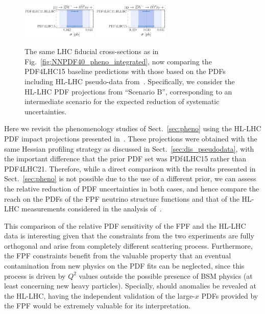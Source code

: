 \begin{figure}[!h]
	\includegraphics[width=0.32\textwidth]{plots/LHCpheno/NNPDF_WPZ_14TEV_40_PHENO-integrated-HLLHC.pdf}
	\includegraphics[width=0.32\textwidth]{plots/LHCpheno/NNPDF_WMZ_14TEV_40_PHENO-integrated-HLLHC.pdf}
	\caption{The same LHC fiducial cross-sections as in Fig.~\ref{fig:NNPDF40_pheno_integrated},
          now comparing the PDF4LHC15 baseline predictions with those based
          on the PDFs including HL-LHC pseudo-data from~\cite{AbdulKhalek:2018rok}.
          Specifically, we consider the HL-LHC PDF projections
          from ``Scenario B'', corresponding to an intermediate scenario for the expected reduction
          of systematic uncertainties. }
	\label{fig:HLLHC_pheno_integrated}
\end{figure}

Here we revisit the phenomenology studies of
Sect.~\ref{sec:pheno} using the HL-LHC PDF impact projections
presented in~\cite{AbdulKhalek:2018rok}.
%
These projections were obtained with the same Hessian profiling strategy
as discussed in Sect.~\ref{sec:dis_pseudodata}, with the important
difference that the prior PDF set was PDf4LHC15 rather than
PDF4LHC21.
%
Therefore, while a direct comparison with the results presented in
Sect.~\ref{sec:pheno} is not possible due to the use of a different prior,
we can assess the relative reduction of PDF uncertainties in both cases,
and hence compare the reach on the PDFs of the FPF neutrino structure functions
and that of the HL-LHC measurements considered in the analysis of~\cite{AbdulKhalek:2018rok}.

This comparison of the relative PDF sensitivity of the FPF and
the HL-LHC data is interesting given that the  constraints from the 
two experiments are fully orthogonal and arise from completely different
scattering process.
%
Furthermore, the FPF constraints benefit from the valuable property
that an eventual contamination from new physics on the PDF fits 
can be neglected, since this process is driven by $Q^2$ values outside 
the possible presence of BSM physics (at least concerning new heavy particles).
%
Specially, should anomalies be revealed at the HL-LHC, having the independent
validation of the large-$x$ PDFs provided by the FPF would be extremely valuable 
for its interpretation.

